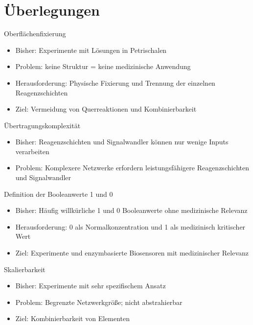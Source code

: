\documentclass{beamer}
\begin{document}
   \section{{\"U}berlegungen}
   	
   \begin{frame}{Oberfl{\"a}chenfixierung}   		
   		\begin{itemize}	
   			\item Bisher: Experimente mit L{\"o}sungen in Petrischalen
   			\item Problem: keine Struktur = keine medizinische Anwendung
   			\item Herausforderung: Physische Fixierung und Trennung der einzelnen Reagenzschichten
   			\item Ziel: Vermeidung von Querreaktionen und Kombinierbarkeit   			
   		\end{itemize}
	\end{frame}
	
	
	\begin{frame}{{\"U}bertragungskomplexit{\"a}t}		
		\begin{itemize}	
			\item Bisher: Reagenzschichten und Signalwandler k{\"o}nnen nur wenige Inputs verarbeiten
			\item Problem: Komplexere Netzwerke erfordern leistungsf\"ahigere Reagenzschichten und Signalwandler			
		\end{itemize}
		\end{frame}

	\begin{frame}{Definition der Booleanwerte 1 und 0}		
		\begin{itemize}	
			\item Bisher: H\"aufig willk\"urliche 1 und 0 Booleanwerte ohne medizinische Relevanz 
			\item Herausforderung: 0 als Normalkonzentration und 1 als medizinisch kritischer Wert
			\item Ziel: Experimente und enzymbasierte Biosensoren mit medizinischer Relevanz			
		\end{itemize}
		\end{frame}


	\begin{frame}{Skalierbarkeit}
		\begin{itemize}	
			\item Bisher: Experimente mit sehr spezifischem Ansatz 
			\item Problem: Begrenzte Netzwerkgr\"o\ss{}e; nicht abstrahierbar
			\item Ziel: Kombinierbarkeit von Elementen
		\end{itemize}
	\end{frame}
\end{document}
